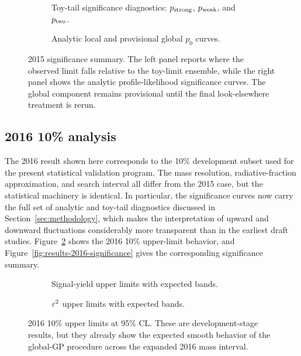 \begin{figure}[H]
\centering
\begin{subfigure}[t]{0.48\linewidth}
  \centering
  \caption{Toy-tail significance diagnostics: $p_{\rm strong}$, $p_{\rm weak}$, and
  $p_{\rm two}$.}
\end{subfigure}
\hfill
\begin{subfigure}[t]{0.48\linewidth}
  \centering
  \caption{Analytic local and provisional global $p_0$ curves.}
\end{subfigure}
\caption{2015 significance summary. The left panel reports where the observed limit
falls relative to the toy-limit ensemble, while the right panel shows the analytic
profile-likelihood significance curves. The global component remains provisional until
the final look-elsewhere treatment is rerun.}
\label{fig:results-2015-significance}
\end{figure}

\subsection{2016 10\% analysis}
\label{sec:results-2016}

The 2016 result shown here corresponds to the 10\% development subset used for the
present statistical validation program. The mass resolution, radiative-fraction
approximation, and search interval all differ from the 2015 case, but the statistical
machinery is identical. In particular, the significance curves now carry the full set
of analytic and toy-tail diagnostics discussed in Section~\ref{sec:methodology}, which
makes the interpretation of upward and downward fluctuations considerably more
transparent than in the earliest draft studies.
Figure~\ref{fig:results-2016-ul} shows the 2016 10\% upper-limit behavior, and
Figure~\ref{fig:results-2016-significance} gives the corresponding significance
summary.

\begin{figure}[H]
\centering
\begin{subfigure}[t]{0.48\linewidth}
  \centering
  \caption{Signal-yield upper limits with expected bands.}
\end{subfigure}
\hfill
\begin{subfigure}[t]{0.48\linewidth}
  \centering
  \caption{$\varepsilon^2$ upper limits with expected bands.}
\end{subfigure}
\caption{2016 10\% upper limits at 95\% CL. These are development-stage results, but
they already show the expected smooth behavior of the global-GP procedure across the
expanded 2016 mass interval.}
\label{fig:results-2016-ul}
\end{figure}

